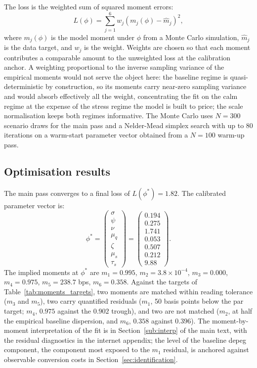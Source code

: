 The loss is the weighted sum of squared moment errors:
\begin{equation}\label{eq:loss}
L(\phi) = \sum_{j=1}^{6} w_j (m_j(\phi) - \hat m_j)^2,
\end{equation}
where $m_j(\phi)$ is the model moment under $\phi$ from a Monte Carlo simulation, $\hat m_j$ is the data target, and $w_j$ is the weight. Weights are chosen so that each moment contributes a comparable amount to the unweighted loss at the calibration anchor. A weighting proportional to the inverse sampling variance of the empirical moments would not serve the object here: the baseline regime is quasi-deterministic by construction, so its moments carry near-zero sampling variance and would absorb effectively all the weight, concentrating the fit on the calm regime at the expense of the stress regime the model is built to price; the scale normalisation keeps both regimes informative. The Monte Carlo uses $N=300$ scenario draws for the main pass and a Nelder-Mead simplex search with up to 80 iterations on a warm-start parameter vector obtained from a $N=100$ warm-up pass.

\subsection{Optimisation results}\label{sub:opt_results}

The main pass converges to a final loss of $L(\phi^*) = 1.82$. The calibrated parameter vector is:
\begin{equation}\label{eq:phi_star}
\phi^* = \begin{pmatrix}
\sigma \\ \psi \\ \nu \\ \mu_q \\ \zeta \\ \mu_s \\ \tau_s
\end{pmatrix} = \begin{pmatrix}
0.194 \\ 0.275 \\ 1.741 \\ 0.053 \\ 0.507 \\ 0.212 \\ 9.88
\end{pmatrix}.
\end{equation}
The implied moments at $\phi^*$ are $m_1 = 0.995$, $m_2 = 3.8 \times 10^{-4}$, $m_3 = 0.000$, $m_4 = 0.975$, $m_5 = 238.7$ bps, $m_6 = 0.358$. Against the targets of Table~\ref{tab:moments_targets}, two moments are matched within reading tolerance ($m_3$ and $m_5$), two carry quantified residuals ($m_1$, 50 basis points below the par target; $m_4$, $0.975$ against the $0.902$ trough), and two are not matched ($m_2$, at half the empirical baseline dispersion, and $m_6$, $0.358$ against $0.396$). The moment-by-moment interpretation of the fit is in Section~\ref{sub:interp} of the main text, with the residual diagnostics in the internet appendix; the level of the baseline depeg component, the component most exposed to the $m_1$ residual, is anchored against observable conversion costs in Section~\ref{sec:identification}.

